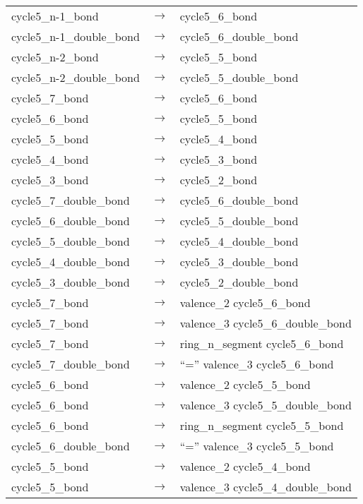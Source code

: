 \begin{longtable}{m{} p{} p{}}
    cycle5\_n-1\_bond & $\rightarrow$ & cycle5\_6\_bond \\
    cycle5\_n-1\_double\_bond & $\rightarrow$ & cycle5\_6\_double\_bond \\
    cycle5\_n-2\_bond & $\rightarrow$ & cycle5\_5\_bond \\
    cycle5\_n-2\_double\_bond & $\rightarrow$ & cycle5\_5\_double\_bond \\
    cycle5\_7\_bond & $\rightarrow$ & cycle5\_6\_bond \\
    cycle5\_6\_bond & $\rightarrow$ & cycle5\_5\_bond \\
    cycle5\_5\_bond & $\rightarrow$ & cycle5\_4\_bond \\
    cycle5\_4\_bond & $\rightarrow$ & cycle5\_3\_bond \\
    cycle5\_3\_bond & $\rightarrow$ & cycle5\_2\_bond \\
    cycle5\_7\_double\_bond & $\rightarrow$ & cycle5\_6\_double\_bond \\
    cycle5\_6\_double\_bond & $\rightarrow$ & cycle5\_5\_double\_bond \\
    cycle5\_5\_double\_bond & $\rightarrow$ & cycle5\_4\_double\_bond \\
    cycle5\_4\_double\_bond & $\rightarrow$ & cycle5\_3\_double\_bond \\
    cycle5\_3\_double\_bond & $\rightarrow$ & cycle5\_2\_double\_bond \\
    cycle5\_7\_bond & $\rightarrow$ & valence\_2 cycle5\_6\_bond \\
    cycle5\_7\_bond & $\rightarrow$ & valence\_3 cycle5\_6\_double\_bond \\
    cycle5\_7\_bond & $\rightarrow$ & ring\_n\_segment cycle5\_6\_bond \\
    cycle5\_7\_double\_bond & $\rightarrow$ & ``='' valence\_3 cycle5\_6\_bond \\
    cycle5\_6\_bond & $\rightarrow$ & valence\_2 cycle5\_5\_bond \\
    cycle5\_6\_bond & $\rightarrow$ & valence\_3 cycle5\_5\_double\_bond \\
    cycle5\_6\_bond & $\rightarrow$ & ring\_n\_segment cycle5\_5\_bond \\
    cycle5\_6\_double\_bond & $\rightarrow$ & ``='' valence\_3 cycle5\_5\_bond \\
    cycle5\_5\_bond & $\rightarrow$ & valence\_2 cycle5\_4\_bond \\
    cycle5\_5\_bond & $\rightarrow$ & valence\_3 cycle5\_4\_double\_bond \\

\end{longtable}
